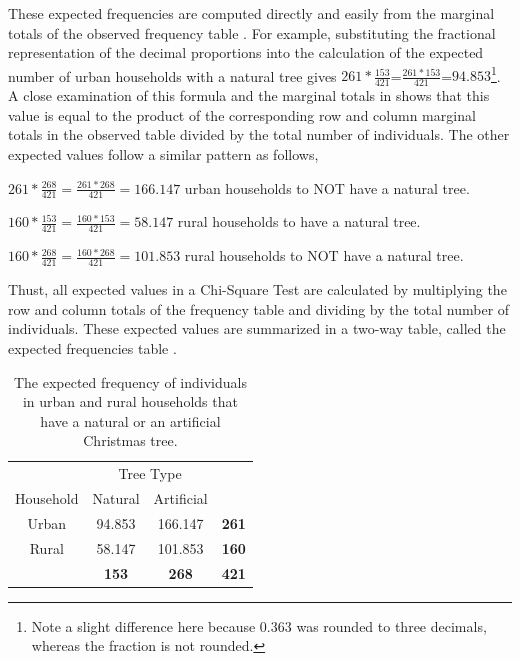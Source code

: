 \documentclass[10pt,openany]{book}\usepackage[]{graphicx}\usepackage[]{color}
\begin{document}
These expected frequencies are computed directly and easily from the marginal totals of the observed frequency table . For example, substituting the fractional representation of the decimal proportions into the calculation of the expected number of urban households with a natural tree gives $261*\frac{153}{421}$=$\frac{261*153}{421}$=$94.853$\footnote{Note a slight difference here because 0.363 was rounded to three decimals, whereas the fraction is not rounded.}. A close examination of this formula and the marginal totals in  shows that this value is equal to the product of the corresponding row and column marginal totals in the observed table divided by the total number of individuals. The other expected values follow a similar pattern as follows,
\begin{Itemize}
  \item $261*\frac{268}{421}=\frac{261*268}{421}=166.147$ urban households to NOT have a natural tree.
  \item $160*\frac{153}{421}=\frac{160*153}{421}=58.147$ rural households to have a natural tree.
  \item $160*\frac{268}{421}=\frac{160*268}{421}=101.853$ rural households to NOT have a natural tree.
\end{Itemize}

Thust, all expected values in a Chi-Square Test are calculated by multiplying the row and column totals of the frequency table and dividing by the total number of individuals. These expected values are summarized in a two-way table, called the expected frequencies table .

\begin{table}[htbp]
  \centering
  \caption{The expected frequency of individuals in urban and rural households that have a natural or an artificial Christmas tree.}\label{tab:ChiTreeExp}
    \begin{tabular}{c|c|c|c|}
      \multicolumn{1}{c}{} & \multicolumn{2}{c}{Tree Type} & \multicolumn{1}{c}{} \\
      \cline{2-3}
      Household & Natural & Artificial & \multicolumn{1}{c}{} \\
      \hline
      \multicolumn{1}{|c|}{Urban} & 94.853 & 166.147 & \textbf{261} \\
      \hline
      \multicolumn{1}{|c|}{Rural} & 58.147 & 101.853 & \textbf{160} \\
      \hline
       & \textbf{153} & \textbf{268} & \textbf{421} \\
      \cline{2-4}
    \end{tabular}
\end{table}
\end{document}
